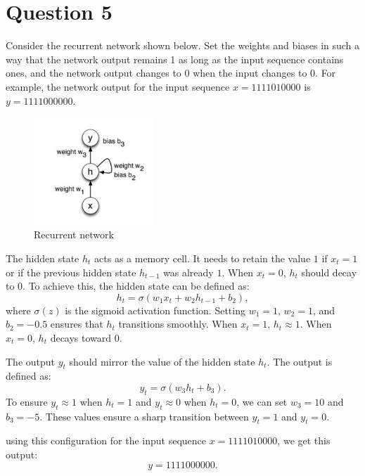 \section{Question 5}
Consider the recurrent network shown below. Set the weights and biases in such a way that the network output remains 1 as long as the input sequence contains ones, and the network output changes to 0 when the input changes to 0. For example, the network output for the input sequence $x = 1111010000$ is $y = 1111000000$.
\begin{figure}[H]
    \centering
	\includegraphics[width = 0.4\textwidth]{Q5.png}
	\caption{Recurrent network}
\end{figure}
\begin{qsolve}
	\begin{qsolve}[]
		The hidden state \( h_t \) acts as a memory cell. It needs to retain the value \( 1 \) if \( x_t = 1 \) or if the previous hidden state \( h_{t-1} \) was already \( 1 \). When \( x_t = 0 \), \( h_t \) should decay to \( 0 \). To achieve this, the hidden state can be defined as:
		\[
		h_t = \sigma(w_1 x_t + w_2 h_{t-1} + b_2),
		\]
		where \( \sigma(z) \) is the sigmoid activation function. Setting \( w_1 = 1 \), \( w_2 = 1 \), and \( b_2 = -0.5 \) ensures that \( h_t \) transitions smoothly. When \( x_t = 1 \), \( h_t \approx 1 \). When \( x_t = 0 \), \( h_t \) decays toward \( 0 \).
		
		The output \( y_t \) should mirror the value of the hidden state \( h_t \). The output is defined as:
		\[
		y_t = \sigma(w_3 h_t + b_3).
		\]
		To ensure \( y_t \approx 1 \) when \( h_t = 1 \) and \( y_t \approx 0 \) when \( h_t = 0 \), we can set \( w_3 = 10 \) and \( b_3 = -5 \). These values ensure a sharp transition between \( y_t = 1 \) and \( y_t = 0 \).
		
		using this configuration for the input sequence \( x = 1111010000 \), we get this output:
\[
y = 1111000000.
\]
	\end{qsolve}
\end{qsolve}